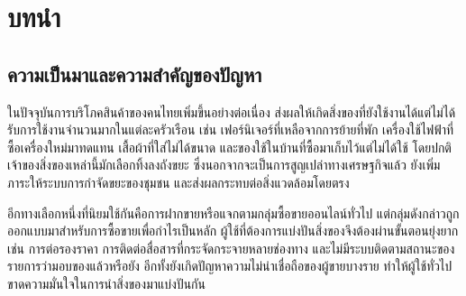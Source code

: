\documentclass[12pt,a4paper]{report}
\newif\iffrontmode
\begin{document}
\newpage

\listoftables

\newpage

\listoffigures

\clearpage
{}
\frontmodefalse

\chapter{บทนำ}

\section{ความเป็นมาและความสำคัญของปัญหา}

ในปัจจุบันการบริโภคสินค้าของคนไทยเพิ่มขึ้นอย่างต่อเนื่อง ส่งผลให้เกิดสิ่งของที่ยังใช้งานได้แต่ไม่ได้รับการใช้งานจำนวนมากในแต่ละครัวเรือน เช่น เฟอร์นิเจอร์ที่เหลือจากการย้ายที่พัก เครื่องใช้ไฟฟ้าที่ซื้อเครื่องใหม่มาทดแทน เสื้อผ้าที่ใส่ไม่ได้ขนาด และของใช้ในบ้านที่ซื้อมาเก็บไว้แต่ไม่ได้ใช้ โดยปกติเจ้าของสิ่งของเหล่านี้มักเลือกทิ้งลงถังขยะ ซึ่งนอกจากจะเป็นการสูญเปล่าทางเศรษฐกิจแล้ว ยังเพิ่มภาระให้ระบบการกำจัดขยะของชุมชน และส่งผลกระทบต่อสิ่งแวดล้อมโดยตรง

\vspace{0.4em}

อีกทางเลือกหนึ่งที่นิยมใช้กันคือการฝากขายหรือแจกตามกลุ่มซื้อขายออนไลน์ทั่วไป แต่กลุ่มดังกล่าวถูกออกแบบมาสำหรับการซื้อขายเพื่อกำไรเป็นหลัก ผู้ใช้ที่ต้องการแบ่งปันสิ่งของจึงต้องผ่านขั้นตอนยุ่งยาก เช่น การต่อรองราคา การติดต่อสื่อสารที่กระจัดกระจายหลายช่องทาง และไม่มีระบบติดตามสถานะของรายการว่ามอบของแล้วหรือยัง อีกทั้งยังเกิดปัญหาความไม่น่าเชื่อถือของผู้ขายบางราย ทำให้ผู้ใช้ทั่วไปขาดความมั่นใจในการนำสิ่งของมาแบ่งปันกัน
\end{document}
